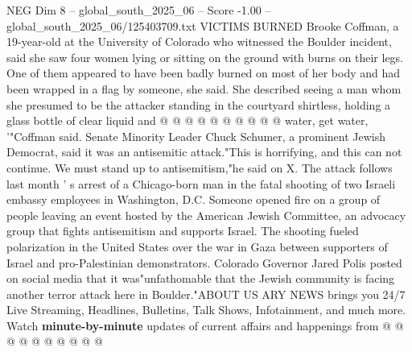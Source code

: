 \begin{textsample}{NEG Dim 8 – global\_south\_2025\_06 – Score -1.00 – global\_south\_2025\_06/125403709.txt}
VICTIMS BURNED Brooke Coffman, a 19-year-old at the University of Colorado who witnessed the Boulder incident, said she saw four women lying or sitting on the ground with burns on their legs.
One of them appeared to have been badly burned on most of her body and had been wrapped in a flag by someone, she said.
She described seeing a man whom she presumed to be the attacker standing in the courtyard shirtless, holding a glass bottle of clear liquid and @ @ @ @ @ @ @ @ @ @ water, get water, '"Coffman said.
Senate Minority Leader Chuck Schumer, a prominent Jewish Democrat, said it was an antisemitic attack."This is horrifying, and this can not continue.
We must stand up to antisemitism,"he said on X.
The attack follows last month ' s arrest of a Chicago-born man in the fatal shooting of two Israeli embassy employees in Washington, D.C.
Someone opened fire on a group of people leaving an event hosted by the American Jewish Committee, an advocacy group that fights antisemitism and supports Israel.
The shooting fueled polarization in the United States over the war in Gaza between supporters of Israel and pro-Palestinian demonstrators.
Colorado Governor Jared Polis posted on social media that it was"unfathomable that the Jewish community is facing another terror attack here in Boulder."ABOUT US ARY NEWS brings you 24/7 Live Streaming, Headlines, Bulletins, Talk Shows, Infotainment, and much more.
Watch \textbf{minute-by-minute} updates of current affairs and happenings from @ @ @ @ @ @ @ @ @ @

\end{textsample}
